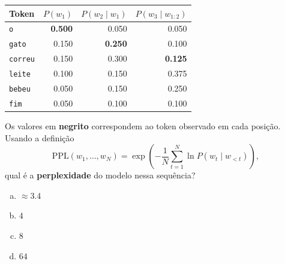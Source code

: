 \documentclass{dlproblemset}
\begin{document}
\begin{enumerate}[I)]
\begin{center}
\begin{tabular}{lrrr}
  \toprule
  \textbf{Token}
    & $P(w_1)$
    & $P(w_2\mid w_1)$
    & $P(w_3\mid w_{1:2})$ \\
  \midrule
  \texttt{o}       & \textbf{0.500} & 0.050 & 0.050 \\
  \texttt{gato}    & 0.150 & \textbf{0.250} & 0.100 \\
  \texttt{correu}  & 0.150 & 0.300 & \textbf{0.125} \\
  \texttt{leite}   & 0.100 & 0.150 & 0.375 \\
  \texttt{bebeu}   & 0.050 & 0.150 & 0.250 \\
  \texttt{fim}     & 0.050 & 0.100 & 0.100 \\
  \bottomrule
\end{tabular}
\end{center}

Os valores em \textbf{negrito} correspondem ao token observado em
cada posição. Usando a definição
\[
  \mathrm{PPL}(w_1,\ldots,w_N)
    = \exp\!\left(-\frac{1}{N}\sum_{t=1}^{N}\ln P(w_t\mid w_{<t})\right),
\]
qual é a \textbf{perplexidade} do modelo nessa sequência?

\begin{enumerate}[a)]
    \item $\approx 3.4$
    \item $4$
    \item $8$
    \item $64$
\end{enumerate}


\end{enumerate}
\end{document}
